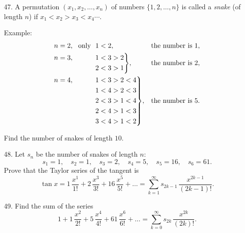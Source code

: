 \begin{problem}{47.}
	A permutation $(x_1,x_2, \dotsc,x_n)$ of numbers $\{1, 2, \dotsc, n\}$ is called a
    \emph{snake} (of length $n$) if $x_1<x_2>x_3<x_4 \dotsb$.

	\begin{note}{Example:}
		\begin{equation*}
			\begin{aligned}[t]
				&\begin{aligned}[t] n=2, \text{\ \ only\ \ } 1<2, \end{aligned} &&\text{the number is }1, \\
				&\hskip-\nulldelimiterspace\mathord{\left.\begin{aligned} n=3, \hphantom{\text{\ \ only\ \ }} 1&<3>2 \\
				2&<3>1\end{aligned} \right\}}, && \text{the number is }2, \\
				&\hskip-\nulldelimiterspace\mathord{\left.\begin{aligned} n=4, \hphantom{\text{\ \ only\ \ }} 1&<3>2<4 \\
				1&<4>2<3 \\
				2&<3>1<4 \\
				2&<4>1<3 \\
				3&<4>1<2\end{aligned} \right\}},
				&&\text{the number is }5. \\
			\end{aligned}
		\end{equation*}
	\end{note}
	Find the number of snakes of length $10$.
\end{problem}

\begin{problem}{48.}
	Let $s_n$ be the number of snakes of length $n$:
	\begin{equation*}
		s_1=1, \quad s_2=1, \quad s_3=2, \quad s_4=5, \quad s_5=16, \quad s_6=61.
	\end{equation*}
	Prove that the Taylor series of the tangent is
	\begin{equation*}
		\tan x=1\, \frac{x^1}{1!}+2\, \frac{x^3}{3!}+16\, \frac{x^5}{5!}+\dots=
		\textstyle\sum\limits_{k=1}^{\infty} s_{2k-1}\, \frac{x^{2k-1}}{(2k-1)!}.
	\end{equation*}
\end{problem}

\begin{problem}{49.}
	Find the sum of the series
	\begin{equation*}
		1+1\, \frac{x^2}{2!}+5\, \frac{x^4}{4!}+61\, \frac{x^6}{6!}+\dots=
		\textstyle\sum\limits_{k=0}^{\infty} s_{2k}\,\frac{x^{2k}}{(2k)!}.
	\end{equation*}
\end{problem}

